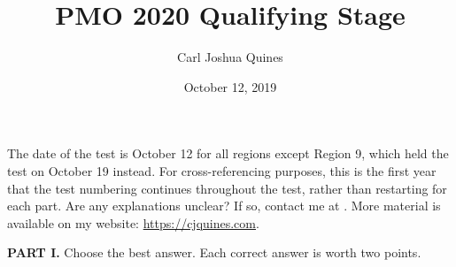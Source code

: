 \documentclass[11pt,paper=letter]{scrartcl}
\begin{document}
\title{PMO 2020 Qualifying Stage}
\author{Carl Joshua Quines}
\date{October 12, 2019}

\maketitle

The date of the test is October 12 for all regions except Region 9, which held the test on October 19 instead. For cross-referencing purposes, this is the first year that the test numbering continues throughout the test, rather than restarting for each part. Are any explanations unclear? If so, contact me at . More material is available on my website: \url{https://cjquines.com}.

\textbf{PART I.} Choose the best answer. Each correct answer is worth two points.
\end{document}
